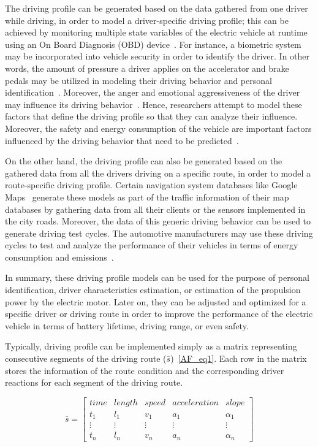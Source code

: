 The driving profile can be generated based on the data gathered from one driver while driving, in order to model a driver-specific driving profile; this can be achieved by monitoring multiple state variables of the electric vehicle at runtime using an On Board Diagnosis (OBD) device~\cite{AF_18}. For instance, a biometric system may be incorporated into vehicle security in order to identify the driver. In other words, the amount of pressure a driver applies on the accelerator and brake pedals may be utilized in modeling their driving behavior and personal identification~\cite{AF_19,AF_20}. Moreover, the anger and emotional aggressiveness of the driver may influence its driving behavior~\cite{AF_21,AF_22,AF_23}. Hence, researchers attempt to model these factors that define the driving profile so that they can analyze their influence. Moreover, the safety and energy consumption of the vehicle are important factors influenced by the driving behavior that need to be predicted~\cite{AF_23,AF_24}. 

On the other hand, the driving profile can also be generated based on the gathered data from all the drivers driving on a specific route, in order to model a route-specific driving profile. Certain navigation system databases like Google Maps~\cite{AF_25} generate these models as part of the traffic information of their map databases by gathering data from all their clients or the sensors implemented in the city roads. Moreover, the data of this generic driving behavior can be used to generate driving test cycles. The automotive manufacturers may use these driving cycles to test and analyze the performance of their vehicles in terms of energy consumption and emissions~\cite{AF_26,AF_27}.

In summary, these driving profile models can be used for the purpose of personal identification, driver characteristics estimation, or estimation of the propulsion power by the electric motor. Later on, they can be adjusted and optimized for a specific driver or driving route in order to improve the performance of the electric vehicle in terms of battery lifetime, driving range, or even safety.

Typically, driving profile can be implemented simply as a matrix representing consecutive segments of the driving route ($\bar{s}$)~\eqref{AF_eq1}. Each row in the matrix stores the information of the route condition and the corresponding driver reactions for each segment of the driving route.

\begin{equation}
\bar{s} = 
\begin{bmatrix} 	
time 		& length 	& speed 	& acceleration 	& slope \\ 
t_1		&l_1		&v_1		&a_1			&\alpha_1	\\
\vdots 	&\vdots 	&\vdots 	&\vdots 		&\vdots \\
t_n		&l_n		&v_n		&a_n			&\alpha_n	
\end{bmatrix}
\label{AF_eq1}
\end{equation}

